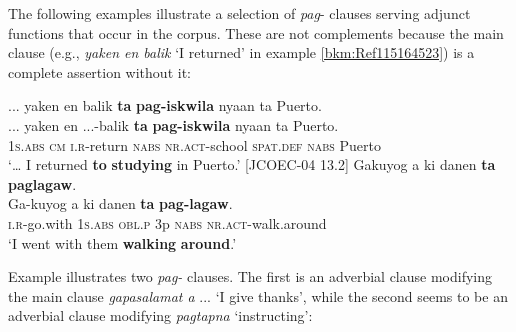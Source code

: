 The following examples illustrate a selection of \textit{pag}{}- clauses serving adjunct functions that occur in the corpus. These are not complements because the main clause (e.g., \textit{yaken en balik} ‘I returned’ in example \ref{bkm:Ref115164523}) is a complete assertion without it:

\ea
\label{bkm:Ref115164523}
... yaken  en  balik  \textbf{ta}  \textbf{pag-iskwila}  nyaan  ta  Puerto. \smallskip\\
\gll ... yaken  en  ...-balik  \textbf{ta}  \textbf{pag-iskwila}  nyaan  ta  Puerto. \\
{}   1\textsc{s.abs}  \textsc{cm}  \textsc{i.r}-return  \textsc{nabs}  \textsc{nr.act}-school  \textsc{spat.def}  \textsc{nabs}  Puerto  \\
\glt ‘… I returned \textbf{to} \textbf{studying} in Puerto.’ [JCOEC-04 13.2]
\z
\ea
Gakuyog  a  ki  danen  \textbf{ta}  \textbf{paglagaw}. \smallskip\\
\gll Ga-kuyog  a  ki  danen  \textbf{ta}  \textbf{pag-lagaw}. \\
\textsc{i.r}-go.with  1\textsc{s.abs}  \textsc{obl.p}  3p  \textsc{nabs}  \textsc{nr.act}-walk.around \\
\glt ‘I went with them \textbf{walking} \textbf{around}.’
\z

Example  illustrates two \textit{pag-} clauses. The first is an adverbial clause modifying the main clause \textit{gapasalamat a} ... ‘I give thanks’, while the second seems to be an adverbial clause modifying \textit{pagtapna} ‘instructing’:

